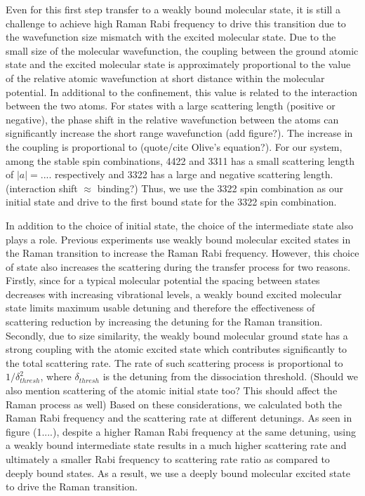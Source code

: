 \documentclass[aps,prl,twocolumn,groupedaddress]{revtex4-1}
\newcommand{\abs}[1]{{\left|{#1}\right|}}
\begin{document}
Even for this first step transfer to a weakly bound molecular state, it is still a challenge to achieve high Raman Rabi frequency to drive this transition due to the wavefunction size mismatch with the excited molecular state. Due to the small size of the molecular wavefunction, the coupling between the ground atomic state and the excited molecular state is approximately proportional to the value of the relative atomic wavefunction at short distance within the molecular potential. In additional to the confinement, this value is related to the interaction between the two atoms. For states with a large scattering length (positive or negative), the phase shift in the relative wavefunction between the atoms can significantly increase the short range wavefunction (add figure?). The increase in the coupling is proportional to (quote/cite Olive's equation?). For our system, among the stable spin combinations, 4422 and 3311 has a small scattering length of $\abs{a}=....$ respectively and 3322 has a large and negative scattering length. (interaction shift $\approx$ binding?) Thus, we use the 3322 spin combination as our initial state and drive to the first bound state for the 3322 spin combination.

In addition to the choice of initial state, the choice of the intermediate state also plays a role. Previous experiments use weakly bound molecular excited states in the Raman transition to increase the Raman Rabi frequency. However, this choice of state also increases the scattering during the transfer process for two reasons.
Firstly, since for a typical molecular potential the spacing between states
decreases with increasing vibrational levels,
a weakly bound excited molecular state limits maximum usable detuning and therefore the effectiveness of scattering reduction by increasing the detuning for the Raman transition.
Secondly, due to size similarity, the weakly bound molecular ground state has a strong coupling with the atomic excited state which contributes significantly to the total scattering rate.
The rate of such scattering process is proportional to $1/\delta_{thresh}^2$,
where $\delta_{thresh}$ is the detuning from the dissociation threshold. (Should we also mention scattering of the atomic initial state too? This should affect the Raman process as well)
Based on these considerations, we calculated both the Raman Rabi frequency and the scattering rate at different detunings. As seen in figure (1....), despite a higher Raman Rabi frequency at the same detuning, using a weakly bound intermediate state results in a much higher scattering rate and ultimately a smaller Rabi frequency to scattering rate ratio as compared to deeply bound states. As a result, we use a deeply bound molecular excited state to drive the Raman transition.
\end{document}
